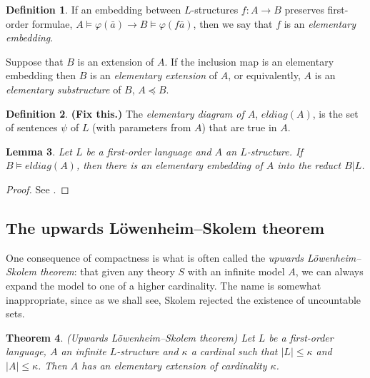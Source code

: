 \documentclass[10pt, a4paper, oneside]{article}
\newtheorem{thm}{Theorem}[section]
\theoremstyle{definition}
\newtheorem{dfn}[thm]{Definition}
\theoremstyle{remark}
\theoremstyle{plain}
\newtheorem{lem}[thm]{Lemma}
\theoremstyle{plain}
\begin{document}
\begin{dfn}
    If an embedding between $L$-structures $f : A \rightarrow B$ preserves
    first-order formulae, $A \models \varphi(\bar{a}) \rightarrow B \models
    \varphi(f\bar{a})$, then we say that $f$ is an \emph{elementary embedding}.

    Suppose that $B$ is an extension of $A$. If the inclusion map is an
    elementary embedding then $B$ is an \emph{elementary extension} of $A$, or
    equivalently, $A$ is an \emph{elementary substructure} of $B$, $A
    \preccurlyeq B$.
\end{dfn}

\begin{dfn}
    \textbf{(Fix this.)}
    The \emph{elementary diagram of $A$},
       $eldiag(A)$, is the set of sentences $\psi$ of $L$ (with parameters from
       $A$) that are true in $A$.
\end{dfn}

\begin{lem}
    \label{eldiag_lem}
    Let $L$ be a first-order language and $A$ an $L$-structure. If $B \models
    eldiag(A)$, then there is an elementary embedding of $A$ into the reduct
    $B | L$.
\end{lem}

\begin{proof}
    See \citealt[p. 49]{hodges1997}.
\end{proof}

\subsection{The upwards Löwenheim--Skolem theorem}

One consequence of compactness is what is often called the \emph{upwards
Löwenheim--Skolem theorem}: that given any theory $S$ with an infinite model
$A$, we can always expand the model to one of a higher cardinality. The name is
somewhat inappropriate, since as we shall see, Skolem rejected the existence of
uncountable sets.

\begin{thm}
    \label{up_lst}
    (Upwards Löwenheim--Skolem theorem)
    Let $L$ be a first-order language, $A$ an infinite $L$-structure and
    $\kappa$ a cardinal such that $|L| \leq \kappa$ and $|A| \leq \kappa$. Then
    $A$ has an elementary extension of cardinality $\kappa$.
\end{thm}
\end{document}
